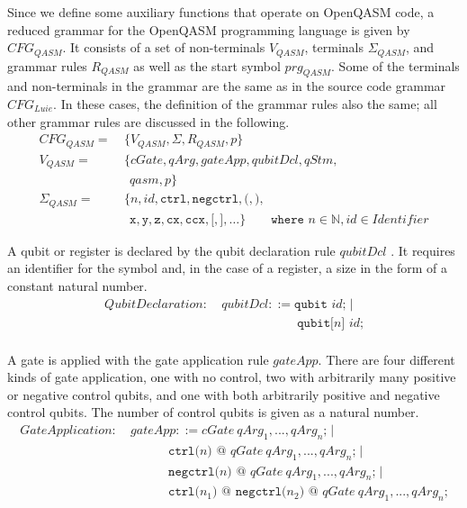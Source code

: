 Since we define some auxiliary functions that operate on OpenQASM code, a reduced grammar for the OpenQASM programming language is given by $CFG_{QASM}$. It consists of a set of non-terminals $V_{QASM}$, terminals $\Sigma_{QASM}$, and grammar rules $R_{QASM}$ as well as the start symbol $prg_{QASM}$. Some of the terminals and non-terminals in the grammar are the same as in the source code grammar $CFG_{Luie}$. In these cases, the definition of the grammar rules also the same; all other grammar rules are discussed in the following.
\begin{align*}
    CFG_{QASM} = \ & \{V_{QASM}, \Sigma, R_{QASM}, p \}\\ 
    V_{QASM} = \ & \{ cGate, qArg, gateApp, qubitDcl, qStm,\\ 
            & \ \  qasm, p \}\\ 
    \Sigma_{QASM} = \ & \{n, id, \texttt{ctrl}, \texttt{negctrl}, \texttt{(}, \texttt{)}, \\
               & \ \ \texttt{x}, \texttt{y}, \texttt{z}, \texttt{cx}, \texttt{ccx}, \texttt{[}, \texttt{]}, \dots \} \quad \quad \texttt{where } n \in \mathbb{N}, id \in Identifier
\end{align*}

A qubit or register is declared by the qubit declaration rule $qubitDcl$ . It requires an identifier for the symbol and, in the case of a register, a size in the form of a constant natural number. 
\begin{align*}
    QubitDeclaration: \ & qubitDcl::= \texttt{qubit } id \texttt{;} \mid\\
    & \hspace{6em} \texttt{qubit[}n\texttt{] } id \texttt{;}\\
\end{align*}

A gate is applied with the gate application rule $gateApp$. There are four different kinds of gate application, one with no control, two with arbitrarily many positive or negative control qubits, and one with both arbitrarily positive and negative control qubits. The number of control qubits is given as a natural number. 
\begin{align*}
GateApplication: \ & gateApp::= cGate \ qArg_1, ..., qArg_n \texttt{;} \mid\\
& \quad \quad \quad \texttt{ctrl(}n\texttt{)} \texttt{ @ } qGate \ qArg_1, ..., qArg_n \texttt{;} \mid\\
& \quad \quad \quad \texttt{negctrl(}n\texttt{)} \texttt{ @ } qGate \ qArg_1, ..., qArg_n \texttt{;} \mid\\
    & \quad \quad \quad \texttt{ctrl(}n_1\texttt{)} \texttt{ @ } \texttt{negctrl(}n_2\texttt{)} \texttt{ @ } qGate \ qArg_1, ..., qArg_n \texttt{;}\\
\end{align*}

